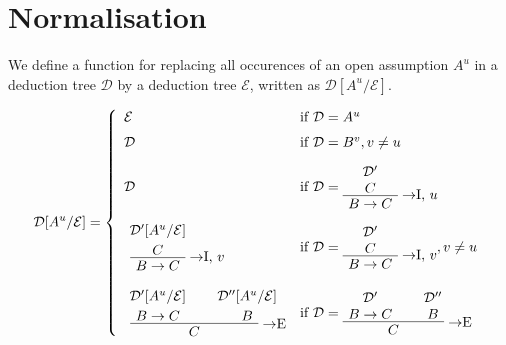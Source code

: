 \section{Normalisation}

\begin{definition}
We define a function for replacing all occurences of an open assumption $A^u$ in
a deduction tree $\mathcal{D}$ by a deduction tree $\mathcal{E}$, written as
$\mathcal{D}[A^u/\mathcal{E}]$.

\[
  \mathcal{D}[A^u/\mathcal{E}] =
  \left\{
  \begin{array}{ll}
  \mathcal{E} & \mbox{if } \mathcal{D} = A^u \\[6pt]
  \mathcal{D} & \mbox{if } \mathcal{D} = B^v, v \neq u \\[10pt]
  \mathcal{D} & \mbox{if } \mathcal{D} =
    \AxiomC{$\mathcal{D}'$}
    \noLine
    \UnaryInfC{$C$}
    \RightLabel{$\to$I, $u$}
    \UnaryInfC{$B \to C$}
    \DisplayProof \\[20pt]
  \AxiomC{$\mathcal{D}'[A^u/\mathcal{E}]$}
  \noLine
  \UnaryInfC{$C$}
  \RightLabel{$\to$I, $v$}
  \UnaryInfC{$B \to C$}
  \DisplayProof & \mbox{if } \mathcal{D} =
    \AxiomC{$\mathcal{D}'$}
    \noLine
    \UnaryInfC{$C$}
    \RightLabel{$\to$I, $v$}
    \UnaryInfC{$B \to C$}
    \DisplayProof, v \neq u \\[24pt]
  \AxiomC{$\mathcal{D}'[A^u/\mathcal{E}]$}
  \noLine
  \UnaryInfC{$B \to C$}
  \AxiomC{$\mathcal{D}''[A^u/\mathcal{E}]$}
  \noLine
  \UnaryInfC{$B$}
  \RightLabel{$\to$E}
  \BinaryInfC{$C$}
  \DisplayProof & \mbox{if } \mathcal{D} =
    \AxiomC{$\mathcal{D}'$}
    \noLine
    \UnaryInfC{$B \to C$}
    \AxiomC{$\mathcal{D}''$}
    \noLine
    \UnaryInfC{$B$}
    \RightLabel{$\to$E}
    \BinaryInfC{$C$}
    \DisplayProof
  \end{array}
  \right.
\]
\end{definition}


